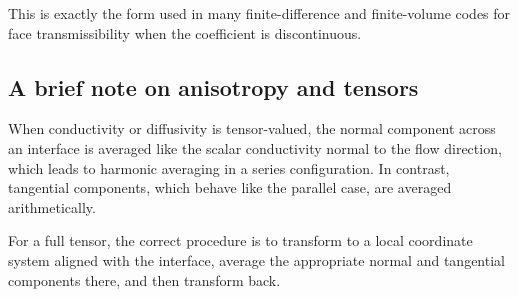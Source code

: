 \documentclass[a4paper,10pt]{article}
\begin{document}
This is exactly the form used in many finite-difference and finite-volume codes for face transmissibility when the coefficient is discontinuous.

\subsection{A brief note on anisotropy and tensors}

When conductivity or diffusivity is tensor-valued, the normal component across an interface is averaged like the scalar conductivity normal to the flow direction, which leads to harmonic averaging in a series configuration. In contrast, tangential components, which behave like the parallel case, are averaged arithmetically.

For a full tensor, the correct procedure is to transform to a local coordinate system aligned with the interface, average the appropriate normal and tangential components there, and then transform back.
\end{document}
